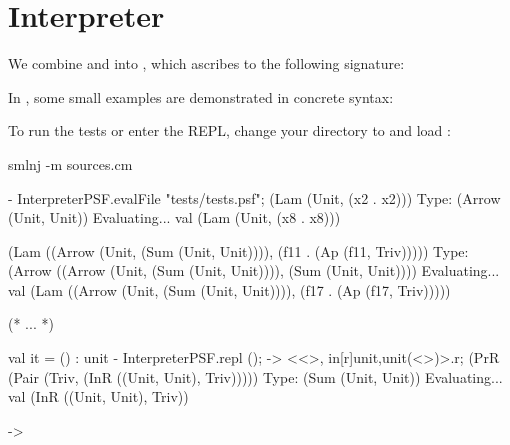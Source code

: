 \documentclass[11pt]{article}
\begin{document}
\section[PSF Interpreter]{\LangPSF{} Interpreter}\label{sec:testing}

We combine  and  into , which ascribes to the following signature:

In , some small \LangPSF{} examples are demonstrated in concrete syntax:

To run the tests or enter the \LangPSF{} REPL, change your directory to  and load :
\begin{codeblock}
  smlnj -m sources.cm

  - InterpreterPSF.evalFile "tests/tests.psf";
  (Lam (Unit, (x2 . x2)))
  Type: (Arrow (Unit, Unit))
  Evaluating... val (Lam (Unit, (x8 . x8)))

  (Lam ((Arrow (Unit, (Sum (Unit, Unit)))), (f11 . (Ap (f11, Triv)))))
  Type: (Arrow ((Arrow (Unit, (Sum (Unit, Unit)))), (Sum (Unit, Unit))))
  Evaluating... val (Lam ((Arrow (Unit, (Sum (Unit, Unit)))), (f17 . (Ap (f17, Triv)))))

  (* ... *)

  val it = () : unit
  - InterpreterPSF.repl ();
  -> <<>, in[r]{unit,unit}(<>)>.r;
  (PrR (Pair (Triv, (InR ((Unit, Unit), Triv)))))
  Type: (Sum (Unit, Unit))
  Evaluating... val (InR ((Unit, Unit), Triv))

  ->
\end{codeblock}
\end{document}
